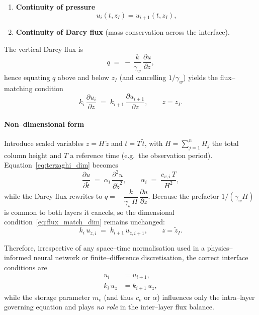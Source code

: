 \begin{enumerate}\setlength\itemsep{0pt}
\item \textbf{Continuity of pressure}
      \[
        u_i(t,z_I)=u_{i+1}(t,z_I),
      \]
\item \textbf{Continuity of Darcy flux}
      (mass conservation across the interface).
\end{enumerate}

The vertical Darcy flux is
\[
  q \;=\;
  -\,\frac{k}{\gamma_w}\,
  \frac{\partial u}{\partial z},
\]
hence equating $q$ above and below $z_I$ (and cancelling $1/\gamma_w$) yields
the flux--matching condition
\begin{equation}
  k_i\,
  \frac{\partial u_i}{\partial z}
  \;=\;
  k_{i+1}\,
  \frac{\partial u_{i+1}}{\partial z},
  \qquad z=z_I.
  \label{eq:flux_match_dim}
\end{equation}

\paragraph{Non--dimensional form}
Introduce scaled variables $z = H\,\tilde z$ and $t = T\,\tilde t$,
with $H=\sum_{j=1}^{n}H_j$ the total column height and $T$ a reference time
(e.g.\ the observation period).
Equation~\eqref{eq:terzaghi_dim} becomes
\[
  \frac{\partial u}{\partial\tilde t}
  \;=\;
  \alpha_i\,
  \frac{\partial^{2}u}{\partial\tilde z^{2}},
  \qquad
  \alpha_i
  \;=\;
  \frac{c_{v,i}\,T}{H^{2}},
\]
while the Darcy flux rewrites to
$
  q = -\,\dfrac{k}{\gamma_w H}\,\dfrac{\partial u}{\partial\tilde z}.
$
Because the prefactor $1/(\gamma_w H)$ is common to both layers it cancels,
so the dimensional condition~\eqref{eq:flux_match_dim} remains unchanged:
\[
  k_i\,
  u_{\tilde z,i}
  \;=\;
  k_{i+1}\,
  u_{\tilde z,i+1},
  \qquad z=\tilde z_I.
\]

\noindent
Therefore, irrespective of any space--time normalisation used in a
physics--informed neural network or finite--difference discretisation, the
correct interface conditions are
\begin{align*}
  u_i &= u_{i+1},\\[2pt]
  k_i\,u_z &= k_{i+1}\,u_z,
\end{align*}
while the storage parameter $m_v$ (and thus $c_v$ or $\alpha$) influences only
the intra--layer governing equation and plays \emph{no role} in the inter--layer
flux balance.
\